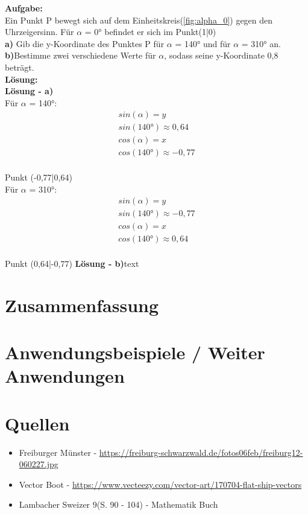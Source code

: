 \documentclass[12pt,a4paper]{article}
\begin{document}
\textbf{Aufgabe:}\\
Ein Punkt P bewegt sich auf dem Einheitskreis(\autoref{fig:alpha_0}) gegen den Uhrzeigersinn. Für $\alpha$ = 0° befindet er sich im Punkt(1|0)\\
\textbf{a)} Gib die y-Koordinate des Punktes P für $\alpha$ = 140° und für $\alpha$ = 310° an.\\
\textbf{b)}Bestimme zwei verschiedene Werte für $\alpha$, sodass seine y-Koordinate 0,8 beträgt.\\
\textbf{Lösung:}\\
\textbf{Lösung - a)}\\
Für $\alpha$ = 140°:\\
\begin{align}
	sin(\alpha) = y \tag{1}        \\
	sin(140°) \approx 0,64 \tag{2} \\
	cos(\alpha) = x \tag{3}        \\
	cos(140°) \approx -0,77 \tag{4}
\end{align}
\\
Punkt (-0,77|0,64)
\\
Für $\alpha$ = 310°:\\
\begin{align}
	sin(\alpha) = y \tag{1}         \\
	sin(140°) \approx -0,77 \tag{2} \\
	cos(\alpha) = x \tag{3}         \\
	cos(140°) \approx 0,64 \tag{4}
\end{align}
\\
Punkt (0,64|-0,77)
\newpage
\textbf{Lösung - b)}text

\newpage
\section{Zusammenfassung}

\section{Anwendungsbeispiele / Weiter Anwendungen}

\newpage
\section{Quellen}
\begin{itemize}
	\item Freiburger Münster - \url{https://freiburg-schwarzwald.de/fotos06feb/freiburg12-060227.jpg}
	\item Vector Boot - \url{https://www.vecteezy.com/vector-art/170704-flat-ship-vectors}
	\item Lambacher Sweizer 9(S. 90 - 104) - Mathematik Buch
\end{itemize}
\end{document}
